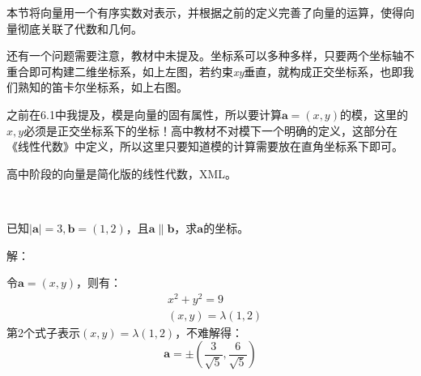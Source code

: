 \begin{tcolorbox}
本节将向量用一个有序实数对表示，并根据之前的定义完善了向量的运算，使得向量彻底关联了代数和几何。
\end{tcolorbox}

\begin{figure}[h]
\centering
\begin{minipage}{.49\textwidth}
\centering
{}
\end{minipage}
\begin{minipage}{.49\textwidth}
\centering
{}
\end{minipage}
\end{figure}

还有一个问题需要注意，教材中未提及。坐标系可以多种多样，只要两个坐标轴不重合即可构建二维坐标系，如上左图，若约束{\it xy}垂直，就构成正交坐标系，也即我们熟知的笛卡尔坐标系，如上右图。

之前在6.1中我提及，模是向量的固有属性，所以要计算$\boldsymbol{a}=\left( x,y \right) $的模，这里的$x,y$必须是正交坐标系下的坐标！高中教材不对模下一个明确的定义，这部分在《线性代数》中定义，所以这里只要知道模的计算需要放在直角坐标系下即可。

\begin{tcolorbox}
高中阶段的向量是简化版的线性代数，XML。
\end{tcolorbox}

~

\begin{example}
已知$\left| \boldsymbol{a} \right|=3,\boldsymbol{b}=\left( 1,2 \right) $，且$\boldsymbol{a}\parallel \boldsymbol{b}$，求$\boldsymbol{a}$的坐标。
\end{example}

解：

令$\boldsymbol{a}=\left( x,y \right) $，则有：
\begin{align*}
&x^2+y^2=9 \\
&\left( x,y \right) =\lambda \left( 1,2 \right)
\end{align*}
第2个式子表示$\left( x,y \right) =\lambda \left( 1,2 \right) $，不难解得：
\[
\boldsymbol{a}=\pm \left( \frac{3}{\sqrt{5}},\frac{6}{\sqrt{5}} \right)
\]

